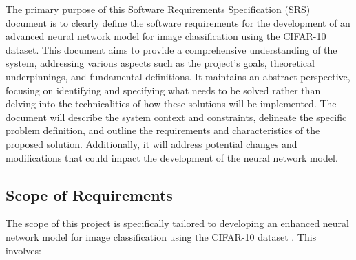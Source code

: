 \documentclass[12pt]{article}
\begin{document}
The primary purpose of this Software Requirements Specification (SRS) document is to clearly define the software 
requirements for the development of an advanced neural network model for image classification using the CIFAR-10 
dataset. This document aims to provide a comprehensive understanding of the system, addressing various aspects 
such as the project's goals, theoretical underpinnings, and fundamental definitions. It maintains an abstract 
perspective, focusing on identifying and specifying what needs to be solved rather than delving into the technicalities 
of how these solutions will be implemented. The document will describe the system context and constraints, delineate 
the specific problem definition, and outline the requirements and characteristics of the proposed solution. Additionally, 
it will address potential changes and modifications that could impact the development of the neural network model.

\subsection{Scope of Requirements} 

The scope of this project is specifically tailored to developing an enhanced neural network model for image 
classification using the CIFAR-10 dataset \cite{CIFAR10}. This involves:
\end{document}
